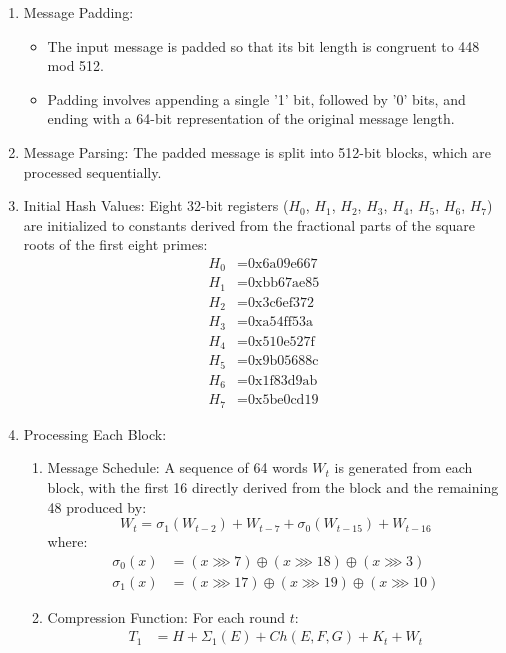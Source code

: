 \documentclass{article}
\begin{document}
\begin{enumerate}
    \item Message Padding:
    \begin{itemize}
        \item The input message is padded so that its bit length is congruent to 448 mod 512.
        \item Padding involves appending a single '1' bit, followed by '0' bits, and ending with a 64-bit representation of the original message length.
    \end{itemize}
    \item Message Parsing: The padded message is split into 512-bit blocks, which are processed sequentially.
    \item Initial Hash Values: Eight 32-bit registers ($H_0$, $H_1$, $H_2$, $H_3$, $H_4$, $H_5$, $H_6$, $H_7$) are initialized to constants derived from the fractional parts of the square roots of the first eight primes:
    \begin{align*}
        H_0 &= \text{0x6a09e667} \\
        H_1 &= \text{0xbb67ae85} \\
        H_2 &= \text{0x3c6ef372} \\
        H_3 &= \text{0xa54ff53a} \\
        H_4 &= \text{0x510e527f} \\
        H_5 &= \text{0x9b05688c} \\
        H_6 &= \text{0x1f83d9ab} \\
        H_7 &= \text{0x5be0cd19}
    \end{align*}
    \item Processing Each Block:
    \begin{enumerate}
        \item Message Schedule: A sequence of 64 words $W_t$ is generated from each block, with the first 16 directly derived from the block and the remaining 48 produced by:
        \[ W_t = \sigma_1(W_{t-2}) + W_{t-7} + \sigma_0(W_{t-15}) + W_{t-16} \]
        where:
        \begin{align*}
            \sigma_0(x) &= (x \ggg 7) \oplus (x \ggg 18) \oplus (x \ggg 3) \\
            \sigma_1(x) &= (x \ggg 17) \oplus (x \ggg 19) \oplus (x \ggg 10)
        \end{align*}
        \item Compression Function: For each round $t$:
        \begin{align*}
            T_1 &= H + \Sigma_1(E) + Ch(E, F, G) + K_t + W_t \\

\end{align*}
\end{enumerate}
\end{enumerate}
\end{document}
